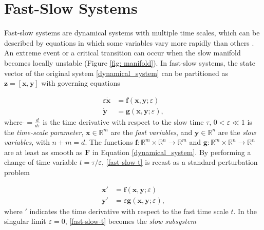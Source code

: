 \documentclass[aps,reprint,prx]{revtex4-2}
\begin{document}
\section{Fast-Slow Systems} \label{section:fast-slow systems}
Fast-slow systems are dynamical systems with multiple time scales, which can be described by equations in which some variables vary more rapidly than others \cite{kuehnMathematicalFrameworkCritical2011, kuehnMultipleTimeScale2015}. {An extreme event or a critical transition can occur when the slow manifold becomes locally unstable (Figure \ref{fig: manifold}).} In fast-slow systems, the state vector of the original system \eqref{dynamical_system} can be partitioned as $\mathbf{z}=[\mathbf{x},\mathbf{y}]$ with governing equations

\begin{equation} \label{fast-slow-t}
    \begin{aligned}
     \varepsilon   \dot{\mathbf{x}} &= \mathbf{f}(\mathbf{x}, \mathbf{y}; \varepsilon) \\
      \dot{\mathbf{y}} &= \mathbf{g}(\mathbf{x}, \mathbf{y}; \varepsilon),
    \end{aligned}
\end{equation}
where $\dot{}=\frac{d}{d\tau}$ is the time derivative with respect to the slow time $\tau$, $0 < \varepsilon\ll1$ is the \textit{time-scale parameter}, $\mathbf{x} \in \mathbb{R}^m$ are the \textit{fast variables}, and $\mathbf{y} \in \mathbb{R}^n$ are the \textit{slow variables}, with $n + m = d$. The functions $\mathbf{f}: \mathbb{R}^m\times\mathbb{R}^n \to \mathbb{R}^m$ and $\mathbf{g}: \mathbb{R}^m\times\mathbb{R}^n \to \mathbb{R}^n$ are at least as smooth as $\mathbf{F}$ in Equation \eqref{dynamical_system}. 
By performing a change of time variable $t = \tau/\varepsilon$, \eqref{fast-slow-t} is recast as a standard perturbation problem \cite{kuehnMultipleTimeScale2015}

\begin{equation} \label{fast-slow-tau}
    \begin{aligned}
      \mathbf{x}' &= \mathbf{f}(\mathbf{x}, \mathbf{y}; \varepsilon) \\
      \mathbf{y}' &= \varepsilon \mathbf{g}(\mathbf{x}, \mathbf{y}; \varepsilon),
    \end{aligned}
\end{equation}
where $'$ indicates the time derivative with respect to the fast time scale $t$. 
{In the singular limit $\varepsilon = 0$, \eqref{fast-slow-t} becomes the \textit{slow subsystem}} \cite{kuehnMultipleTimeScale2015}
\end{document}
